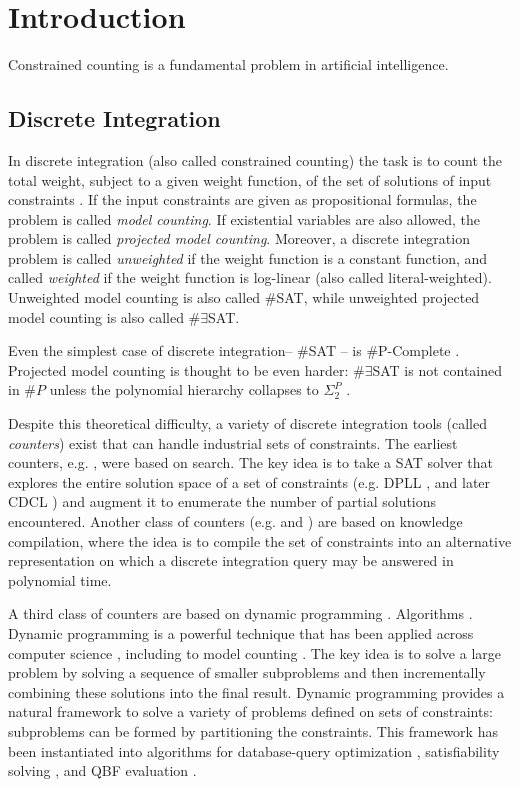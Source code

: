 \chapter{Introduction}
\label{ch:intro}
Constrained counting is a fundamental problem in artificial intelligence.

\section{Discrete Integration}
In discrete integration (also called constrained counting) the task is to count the total weight, subject to a given weight function, of the set of solutions of input constraints \cite{GSS08}. 
If the input constraints are given as propositional formulas, the problem is called \emph{model counting}. 
If existential variables are also allowed, the problem is called \emph{projected model counting}. 
Moreover, a discrete integration problem is called \emph{unweighted} if the weight function is a constant function, and called \emph{weighted} if the weight function is log-linear (also called literal-weighted). Unweighted model counting is also called \#SAT, while unweighted projected model counting is also called $\#\exists$SAT.

Even the simplest case of discrete integration-- \#SAT -- is \#P-Complete \cite{Valiant79}. Projected model counting is thought to be even harder: $\#\exists$SAT is not contained in $\#P$ unless the polynomial hierarchy collapses to $\Sigma_2^P$ \cite{zawadzki2013generalization}.

Despite this theoretical difficulty, a variety of discrete integration tools (called \emph{counters}) exist that can handle industrial sets of constraints. The earliest counters, e.g.  \cite{birnbaum1999good}, were based on search. The key idea is to take a SAT solver that explores the entire solution space of a set of constraints (e.g. DPLL \cite{davis1960computing,davis1962machine}, and later CDCL \cite{biere2009conflict}) and augment it to enumerate the number of partial solutions encountered. Another class of counters (e.g.  \cite{OD15} and  \cite{LM17}) are based on knowledge compilation, where the idea is to compile the set of constraints into an alternative representation on which a discrete integration query may be answered in polynomial time.

A third class of counters are based on dynamic programming \cite{CW16,FHMW17,FHWZ18,FHZ19,DPV20,fichte2020exploiting}. Algorithms \cite{FMR08,SS10}.
Dynamic programming is a powerful technique that has been applied across computer science \cite{bellman1966dynamic}, including to model counting \cite{BDP09,SS10,jegou2016improving}.
The key idea is to solve a large problem by solving a sequence of smaller subproblems and then incrementally combining these solutions into the final result.
Dynamic programming provides a natural framework to solve a variety of problems defined on sets of constraints: subproblems can be formed by partitioning the constraints.
This framework has been instantiated into algorithms for database-query optimization \cite{MPPV04}, satisfiability solving \cite{uribe1994ordered,aguirre2001random,pan2005symbolic}, and QBF evaluation \cite{charwat2016bdd}. 


